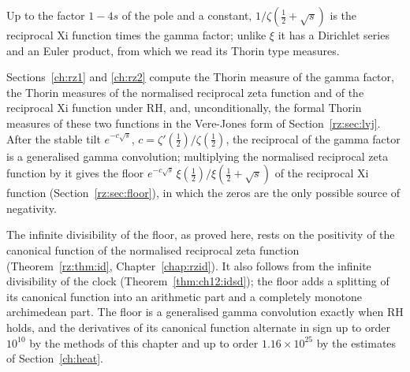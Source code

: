 \label{chap:rzeta}

Up to the factor $1-4s$ of the pole and a constant, $1/\zeta(\frac12+\sqrt s)$ is the reciprocal Xi function times the gamma factor; unlike $\xi$ it has a Dirichlet series and an Euler product, from which we read its Thorin type measures.

Sections~\ref{ch:rz1} and \ref{ch:rz2} compute the Thorin measure of the gamma factor, the Thorin measures of the normalised reciprocal zeta function and of the reciprocal Xi function under RH, and, unconditionally, the formal Thorin measures of these two functions in the Vere-Jones form of Section~\ref{rz:sec:lvj}. After the stable tilt $e^{-c\sqrt s}$, $c=\zeta'(\frac12)/\zeta(\frac12)$, the reciprocal of the gamma factor is a generalised gamma convolution; multiplying the normalised reciprocal zeta function by it gives the floor $e^{-c\sqrt s}\,\xi(\frac12)/\xi(\frac12+\sqrt s)$ of the reciprocal Xi function (Section~\ref{rz:sec:floor}), in which the zeros are the only possible source of negativity.

The infinite divisibility of the floor, as proved here, rests on the positivity of the canonical function of the normalised reciprocal zeta function (Theorem~\ref{rz:thm:id}, Chapter~\ref{chap:rzid}). It also follows from the infinite divisibility of the clock (Theorem~\ref{thm:ch12:idsd}); the floor adds a splitting of its canonical function into an arithmetic part and a completely monotone archimedean part. The floor is a generalised gamma convolution exactly when RH holds, and the derivatives of its canonical function alternate in sign up to order $10^{10}$ by the methods of this chapter and up to order $1.16\times10^{25}$ by the estimates of Section~\ref{ch:heat}.

